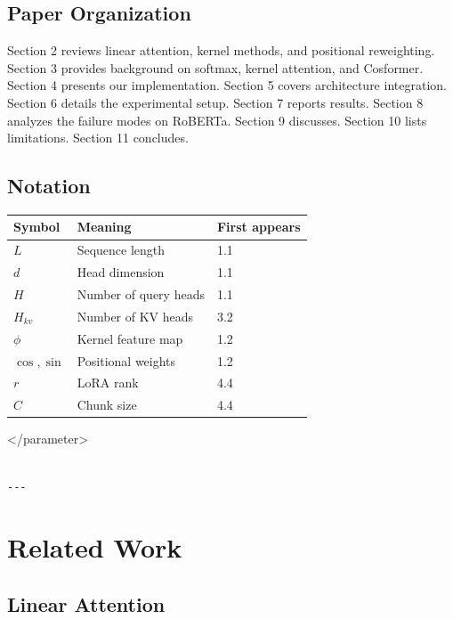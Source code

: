 \subsection{Paper Organization}

Section 2 reviews linear attention, kernel methods, and positional 
reweighting. Section 3 provides background on softmax, kernel attention, 
and Cosformer. Section 4 presents our implementation. Section 5 covers 
architecture integration. Section 6 details the experimental setup. 
Section 7 reports results. Section 8 analyzes the failure modes on 
RoBERTa. Section 9 discusses. Section 10 lists limitations. Section 11 
concludes.



\subsection{Notation}

\begin{table}[H]
\centering
\small
\begin{tabular}{lll}
\toprule
\textbf{Symbol} & \textbf{Meaning} & \textbf{First appears} \\
\midrule
$L$ & Sequence length & 1.1 \\
$d$ & Head dimension & 1.1 \\
$H$ & Number of query heads & 1.1 \\
$H_{kv}$ & Number of KV heads & 3.2 \\
$\phi$ & Kernel feature map & 1.2 \\
$\cos, \sin$ & Positional weights & 1.2 \\
$r$ & LoRA rank & 4.4 \\
$C$ & Chunk size & 4.4 \\
\bottomrule
\end{tabular}
\end{table}
\textless{}/parameter\textgreater{}
\begin{lstlisting}

---
\end{lstlisting}


\section{Related Work}

\subsection{Linear Attention}

